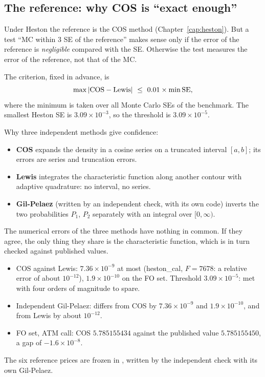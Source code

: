 \subsection{The reference: why COS is ``exact enough''}
Under Heston the reference is the COS method (Chapter~\ref{cap:heston}). But a test ``MC within 3 SE of the
reference'' makes sense only if the error of the reference is \emph{negligible} compared with the SE. Otherwise the
test measures the error of the reference, not that of the MC.

The criterion, fixed in advance, is
\begin{equation}\label{eq:bm-rif}
\max|\text{COS}-\text{Lewis}|\ \le\ 0.01\times\min\mathrm{SE} ,
\end{equation}
where the minimum is taken over all Monte Carlo SEs of the benchmark. The smallest Heston SE is
$3.09\times10^{-3}$, so the threshold is $3.09\times10^{-5}$.

Why three independent methods give confidence:
\begin{itemize}
\item \textbf{COS} expands the density in a cosine series on a truncated interval $[a,b]$; its errors are series and
truncation errors.
\item \textbf{Lewis} integrates the characteristic function along another contour with adaptive quadrature: no
interval, no series.
\item \textbf{Gil-Pelaez} (written by an independent check, with its own code) inverts the two probabilities $P_1$,
$P_2$ separately with an integral over $[0,\infty)$.
\end{itemize}
The numerical errors of the three methods have nothing in common. If they agree, the only thing they share is the
characteristic function, which is in turn checked against published values.

\begin{progetto}[title={In the qpricer project: accuracy of the references}]
\begin{itemize}
\item COS against Lewis: $7.36\times10^{-9}$ at most (heston\_cal, $F=7678$: a relative error of about $10^{-12}$),
$1.9\times10^{-10}$ on the FO set. Threshold $3.09\times10^{-5}$: met with four orders of magnitude to spare.
\item Independent Gil-Pelaez: differs from COS by $7.36\times10^{-9}$ and $1.9\times10^{-10}$, and from Lewis by about
$10^{-12}$.
\item FO set, ATM call: COS $5.785155434$ against the published value $5.785155450$, a gap of $-1.6\times10^{-8}$.
\end{itemize}
The six reference prices are frozen in , written by the independent
check with its own Gil-Pelaez.
\end{progetto}

